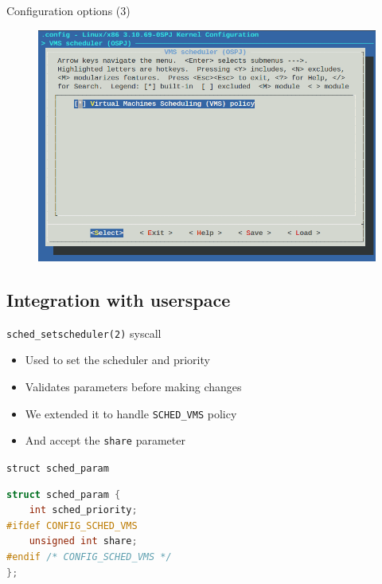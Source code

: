 \begin{frame}{Configuration options (3)}
    \begin{figure}
       \includegraphics[width=0.8\linewidth]{img/menuconfig.png}
    \end{figure}
\end{frame}


%
%

\subsection{Integration with userspace}

\begin{frame}{\texttt{sched\_setscheduler(2)} syscall}
    \begin{itemize}
        \item Used to set the scheduler and priority
        \item Validates parameters before making changes
        \item We extended it to handle \texttt{SCHED\_VMS} policy
        \item And accept the \texttt{share} parameter
    \end{itemize}
\end{frame}

\begin{frame}[fragile]{\texttt{struct sched\_param}}
\begin{lstlisting}[language=C,linebackgroundcolor={%
        \btLstHL<1>{4}%
    }]
struct sched_param {
    int sched_priority;
#ifdef CONFIG_SCHED_VMS
    unsigned int share;
#endif /* CONFIG_SCHED_VMS */
};
\end{lstlisting}
\end{frame}

